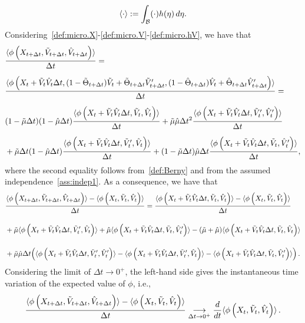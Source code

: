 \documentclass[a4paper]{article}
\theoremstyle{Theorem}\newtheorem{proposition}{Proposition}[section]
\theoremstyle{Remark}\newtheorem{remark}{Remark}[section]
\theoremstyle{Theorem}\newtheorem{theorem}{Theorem}[section]
\DeclarePairedDelimiter\ave{\langle}{\rangle}
\newcommand{\hV}{\hat{V}}
\newcommand{\tV}{\tilde{V}}
\newcommand{\hmu}{\hat{\mu}}
\newcommand{\tmu}{\tilde{\mu}}
\begin{document}
$$ \ave{\cdot}:=\int_\mathcal{B}(\cdot)h(\eta)\,d\eta. $$
Considering~\eqref{def:micro.X}-\eqref{def:micro.V}-\eqref{def:micro.hV}, we have that
\begin{align*}
	&\frac{\ave{\phi\left(X_{t+\Delta t},\tV_{t+\Delta t}, \hV_{t+\Delta t}\right)}}{\Delta{t}}= \\[0.2cm]
	&\frac{\ave{\phi\left(X_{t}+ \tV_t\hV_t\Delta t,(1-\tilde{\Theta}_{t+\Delta t})\tV_{t} + \tilde{\Theta}_{t+\Delta t} \tV_{t+\Delta t}',(1-\hat{\Theta}_{t+\Delta t})\hV_{t} + \hat{\Theta}_{t+\Delta t} \hV_{t+\Delta t}'\right)}}{\Delta{t}}=\\[0.2cm]
&(1- \tmu \Delta t) (1-\hmu\Delta t)\frac{\ave{\phi\left(X_{t}+ \tV_t\hV_t\Delta t,\tV_{t} ,\hV_{t} \right)}}{\Delta{t}}+ \tmu  \hmu\Delta t^2 \frac{\ave{\phi\left(X_{t}+ \tV_t\hV_t\Delta t,\tV_{t}' ,\hV_{t}' \right)}}{\Delta{t}} \\[0.2cm]
&+ \tmu \Delta t (1-\hmu\Delta t)\frac{\ave{\phi\left(X_{t}+ \tV_t\hV_t\Delta t,\tV_{t}' ,\hV_{t} \right)}}{\Delta{t}}+(1- \tmu \Delta t) \hmu\Delta t \frac{\ave{\phi\left(X_{t}+ \tV_t\hV_t\Delta t,\tV_{t} ,\hV_{t}' \right)}}{\Delta{t}},
	\end{align*}
	where the second equality follows from~\eqref{def:Berny} and from the assumed independence~\eqref{ass:indep1}.
As a consequence, we have that
\begin{equation}\label{eq:pass1}
\begin{aligned}[b]
	&\frac{\ave{\phi\left(X_{t+\Delta t},\tV_{t+\Delta t}, \hV_{t+\Delta t}\right)}-\ave{\phi\left(X_t, \tV_t,\hV_t\right)}}{\Delta{t}}= \frac{\ave{\phi\left(X_{t}+ \tV_t\hV_t\Delta t,\tV_{t} ,\hV_{t} \right)}-\ave{\phi\left(X_t, \tV_t,\hV_t\right)}}{\Delta{t}} \\[0.4cm]
&+ \tmu \ave{\phi\left(X_{t}+ \tV_t\hV_t\Delta t,\tV_{t}' ,\hV_{t} \right)}+ \hmu\ave{\phi\left(X_{t}+ \tV_t\hV_t\Delta t,\tV_{t} ,\hV_{t}' \right)}-( \tmu+\hmu)\ave{\phi\left(X_{t}+ \tV_t\hV_t\Delta t,\tV_{t} ,\hV_{t} \right)}\\[0.4cm]
&+ \tmu  \hmu\Delta t \Big(\ave{\phi\left(X_{t}+ \tV_t\hV_t\Delta t,\tV_{t}' ,\hV_{t}' \right)} -\ave{\phi\left(X_{t}+ \tV_t\hV_t\Delta t,\tV_{t}' ,\hV_{t} \right)}-\ave{\phi\left(X_{t}+ \tV_t\hV_t\Delta t,\tV_{t} ,\hV_{t}' \right)}\Big)\,.
\end{aligned}
\end{equation}
Considering the limit of $\Delta{t}\to 0^+$, the left-hand side gives the instantaneous time variation of the expected value of $\phi$, i.e.,
\begin{equation*}
\frac{\ave{\phi\left(X_{t+\Delta t},\tV_{t+\Delta t}, \hV_{t+\Delta t}\right)}-\ave{\phi\left(X_t,\tV_t,\hV_t\right)}}{\Delta{t}}\underset{\Delta{t}\to 0^+}{\longrightarrow}\frac{d}{dt}\ave{\phi\left(X_t, \tV_t,\hV_t\right)}\,.
\end{equation*}
\end{document}
